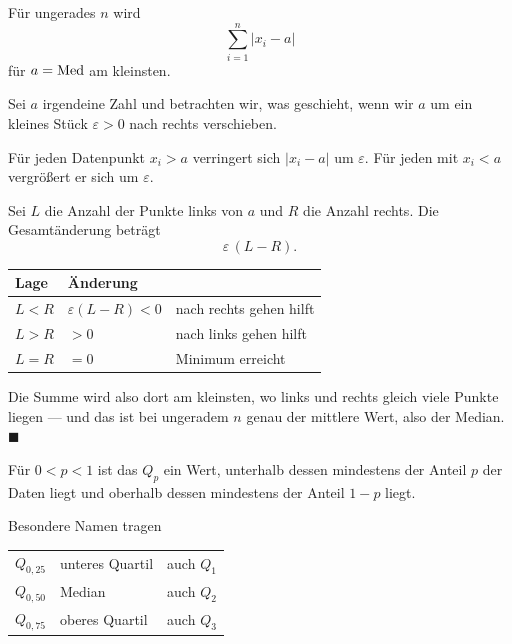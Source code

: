 \begin{merksatz}
Für ungerades $n$ wird
\[ \sum_{i=1}^n |x_i - a| \]
für $a = \operatorname{Med}$ am kleinsten.

Sei $a$ irgendeine Zahl und betrachten wir, was geschieht, wenn wir $a$ um ein kleines Stück $\varepsilon > 0$ nach rechts verschieben.

Für jeden Datenpunkt $x_i > a$ verringert sich $|x_i - a|$ um $\varepsilon$. Für jeden mit $x_i < a$ vergrößert er sich um $\varepsilon$.

Sei $L$ die Anzahl der Punkte links von $a$ und $R$ die Anzahl rechts. Die Gesamtänderung beträgt
\[ \varepsilon\,(L - R) . \]

\begin{center}
\renewcommand{\arraystretch}{1.5}
\begin{tabular}{@{}P{2.4cm}P{3.0cm}P{2.6cm}@{}}
\toprule
\textbf{Lage} & \textbf{Änderung} & \\
\midrule
$L < R$ & $\varepsilon(L-R) < 0$ & nach rechts gehen hilft\\
$L > R$ & $> 0$ & nach links gehen hilft\\
$L = R$ & $= 0$ & \textcolor{gruen}{Minimum erreicht}\\
\bottomrule
\end{tabular}
\end{center}

Die Summe wird also dort am kleinsten, wo links und rechts gleich viele Punkte liegen --- und das ist bei ungeradem $n$ genau der mittlere Wert, also der Median. $\blacksquare$

\begin{center}
\begin{minipage}{0.88\textwidth}
\end{minipage}
\end{center}
\end{merksatz}

\begin{definition}
Für $0 < p < 1$ ist das  $Q_p$ ein Wert, unterhalb dessen mindestens der Anteil $p$ der Daten liegt und oberhalb dessen mindestens der Anteil $1-p$ liegt.

Besondere Namen tragen
\begin{center}
\renewcommand{\arraystretch}{1.45}
\begin{tabular}{@{}P{2.4cm}P{2.0cm}P{3.4cm}@{}}
\toprule
$Q_{0{,}25}$ & unteres Quartil & auch $Q_1$\\
$Q_{0{,}50}$ & Median & auch $Q_2$\\
$Q_{0{,}75}$ & oberes Quartil & auch $Q_3$\\
\bottomrule
\end{tabular}
\end{center}
\end{definition}

